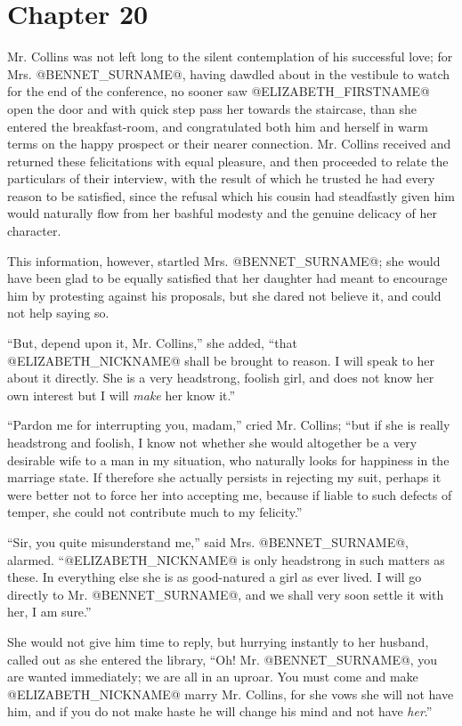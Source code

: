 \chapter*{Chapter 20}


Mr. Collins was not left long to the silent contemplation of his
successful love; for Mrs. @BENNET_SURNAME@, having dawdled about in the vestibule
to watch for the end of the conference, no sooner saw @ELIZABETH_FIRSTNAME@ open
the door and with quick step pass her towards the staircase, than she
entered the breakfast-room, and congratulated both him and herself in
warm terms on the happy prospect or their nearer connection. Mr. Collins
received and returned these felicitations with equal pleasure, and then
proceeded to relate the particulars of their interview, with the result
of which he trusted he had every reason to be satisfied, since the
refusal which his cousin had steadfastly given him would naturally flow
from her bashful modesty and the genuine delicacy of her character.

This information, however, startled Mrs. @BENNET_SURNAME@; she would have been
glad to be equally satisfied that her daughter had meant to encourage
him by protesting against his proposals, but she dared not believe it,
and could not help saying so.

``But, depend upon it, Mr. Collins,'' she added, ``that @ELIZABETH_NICKNAME@ shall be
brought to reason. I will speak to her about it directly. She is a very
headstrong, foolish girl, and does not know her own interest but I will
\textit{make} her know it.''

``Pardon me for interrupting you, madam,'' cried Mr. Collins; ``but if
she is really headstrong and foolish, I know not whether she would
altogether be a very desirable wife to a man in my situation, who
naturally looks for happiness in the marriage state. If therefore she
actually persists in rejecting my suit, perhaps it were better not
to force her into accepting me, because if liable to such defects of
temper, she could not contribute much to my felicity.''

``Sir, you quite misunderstand me,'' said Mrs. @BENNET_SURNAME@, alarmed. ``@ELIZABETH_NICKNAME@ is
only headstrong in such matters as these. In everything else she is as
good-natured a girl as ever lived. I will go directly to Mr. @BENNET_SURNAME@, and
we shall very soon settle it with her, I am sure.''

She would not give him time to reply, but hurrying instantly to her
husband, called out as she entered the library, ``Oh! Mr. @BENNET_SURNAME@, you
are wanted immediately; we are all in an uproar. You must come and make
@ELIZABETH_NICKNAME@ marry Mr. Collins, for she vows she will not have him, and if you
do not make haste he will change his mind and not have \textit{her}.''

